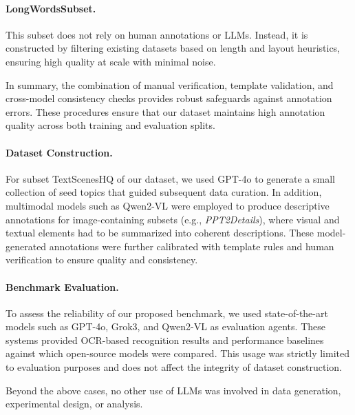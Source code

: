 \paragraph{LongWordsSubset.}  
This subset does not rely on human annotations or LLMs. 
Instead, it is constructed by filtering existing datasets based on length and layout heuristics, ensuring high quality at scale with minimal noise.

\medskip
In summary, the combination of manual verification, template validation, and cross-model consistency checks provides robust safeguards against annotation errors. 
These procedures ensure that our dataset maintains high annotation quality across both training and evaluation splits.




\paragraph{Dataset Construction.}  
For subset TextScenesHQ of our dataset, we used GPT-4o to generate a small collection of seed topics that guided subsequent data curation.  
In addition, multimodal models such as Qwen2-VL were employed to produce descriptive annotations for image-containing subsets (e.g., \textit{PPT2Details}), where visual and textual elements had to be summarized into coherent descriptions.  
These model-generated annotations were further calibrated with template rules and human verification to ensure quality and consistency.  

\paragraph{Benchmark Evaluation.}  
To assess the reliability of our proposed benchmark, we used state-of-the-art models such as GPT-4o, Grok3, and Qwen2-VL as evaluation agents.  
These systems provided OCR-based recognition results and performance baselines against which open-source models were compared.  
This usage was strictly limited to evaluation purposes and does not affect the integrity of dataset construction.  


\medskip
Beyond the above cases, no other use of LLMs was involved in data generation, experimental design, or analysis. 


